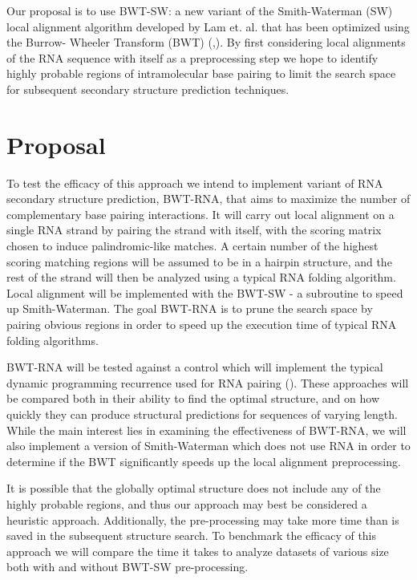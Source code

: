 \documentclass[11pt]{article}
\begin{document}
Our proposal is to use BWT-SW: a new variant of the Smith-Waterman (SW) local 
alignment algorithm developed by Lam et. al. \cite{four} that has been optimized using the Burrow- Wheeler Transform (BWT) (\cite{six},\cite{seven}). By first considering local alignments of the RNA sequence with itself as a preprocessing step we hope to identify highly probable regions of intramolecular base pairing to limit the search space for subsequent secondary structure prediction techniques.


\section{Proposal}
	
To test the efficacy of this approach we intend to implement variant of RNA secondary structure prediction, BWT-RNA, that aims to maximize the number of complementary base pairing interactions. It will carry out local alignment on a single RNA strand by pairing the strand with itself, with the scoring matrix chosen to induce palindromic-like matches. A certain number of the highest scoring matching regions will be assumed to be in a hairpin structure, and the rest of the strand will then be analyzed using a typical RNA folding algorithm. Local alignment will be implemented with the BWT-SW - a subroutine to speed up Smith-Waterman. The goal BWT-RNA is to prune the search space by pairing obvious regions in order to speed up the execution time of typical RNA folding algorithms. 

BWT-RNA will be tested against a control which will implement the typical dynamic programming recurrence used for RNA pairing (\cite{three}).  These approaches will be compared both in their ability to find the optimal structure, and on how quickly they can produce structural predictions for sequences of varying length. While the main interest lies in examining the effectiveness of BWT-RNA, we will also implement a version of Smith-Waterman which does not use RNA in order to determine if the BWT significantly speeds up the local alignment preprocessing. 

It is possible that the globally optimal structure does not include any of the highly probable regions, and thus our approach may best be considered a heuristic approach. Additionally, the pre-processing may take more time than is saved in the subsequent structure search. To benchmark the efficacy of this approach we will compare the time it takes to analyze datasets of various size both with and without BWT-SW pre-processing. 
\end{document}
